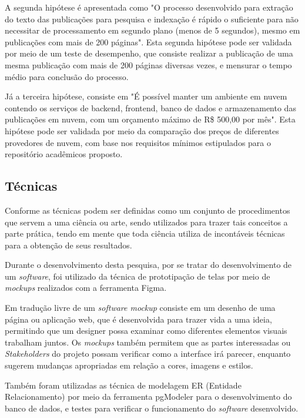 A segunda hipótese é apresentada como "O processo desenvolvido
para extração do texto das publicações para pesquisa e indexação
é rápido o suficiente para não necessitar de processamento em
segundo plano (menos de 5 segundos), mesmo em publicações com mais
de 200 páginas". Esta segunda hipótese pode ser validada por meio
de um teste de desempenho, que consiste realizar a publicação de uma
mesma publicação com mais de 200 páginas diversas vezes, e mensurar
o tempo médio para conclusão do processo.

Já a terceira hipótese, consiste em "É possível manter um ambiente
em nuvem contendo os serviços de backend, frontend, banco de dados
e armazenamento das publicações em nuvem, com um orçamento máximo
de R\$ 500,00 por mês". Esta hipótese pode ser validada por meio
da comparação dos preços de diferentes provedores de nuvem, com
base nos requisitos mínimos estipulados para o repositório
acadêmicos proposto.

\subsection{Técnicas}

Conforme \citep[p. 174]{LAKATOS:metodologia} as técnicas podem
ser definidas como um conjunto de procedimentos que servem a
uma ciência ou arte, sendo utilizados para trazer tais
conceitos a parte prática, tendo em mente que toda ciência utiliza
de incontáveis técnicas para a obtenção de seus resultados.

Durante o desenvolvimento desta pesquisa, por se tratar do
desenvolvimento de um \emph{software}, foi utilizado da técnica
de prototipação de telas por meio de \emph{mockups} realizados
com a ferramenta Figma.

Em tradução livre de \cite{uzayr:mockups} um \emph{software mockup}
consiste em um desenho de uma página ou aplicação web,
que é desenvolvida para trazer vida a uma ideia, permitindo
que um designer possa examinar como diferentes elementos visuais
trabalham juntos. Os \emph{mockups} também permitem que as partes
interessadas ou \emph{Stakeholders} do projeto possam verificar como a
interface irá parecer, enquanto sugerem mudanças
apropriadas em relação a cores, imagens e estilos.

Também foram utilizadas as técnica de modelagem ER (Entidade Relacionamento)
por meio da ferramenta pgModeler para o desenvolvimento do banco de dados,
e testes para verificar o funcionamento do \emph{software} desenvolvido.

